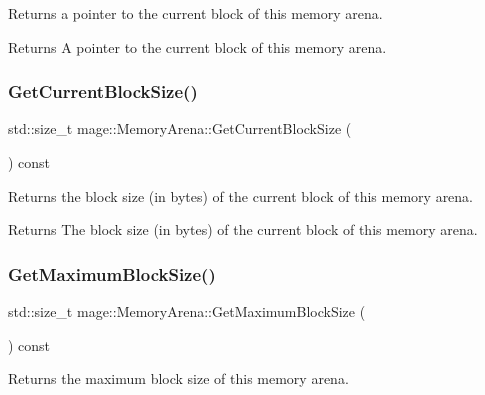Returns a pointer to the current block of this memory arena.

\begin{DoxyReturn}{Returns}
A pointer to the current block of this memory arena. 
\end{DoxyReturn}
\mbox{\label{classmage_1_1_memory_arena_a39be42ace3dfb2afab288926e2e0bca6}} 
\subsubsection{\texorpdfstring{Get\+Current\+Block\+Size()}{GetCurrentBlockSize()}}
{\footnotesize\ttfamily std\+::size\+\_\+t mage\+::\+Memory\+Arena\+::\+Get\+Current\+Block\+Size (\begin{DoxyParamCaption}{ }\end{DoxyParamCaption}) const\hspace{0.3cm}{\ttfamily [noexcept]}}

Returns the block size (in bytes) of the current block of this memory arena.

\begin{DoxyReturn}{Returns}
The block size (in bytes) of the current block of this memory arena. 
\end{DoxyReturn}
\mbox{\label{classmage_1_1_memory_arena_adecbc8148c10c1d50bc2639a44a59fa2}} 
\subsubsection{\texorpdfstring{Get\+Maximum\+Block\+Size()}{GetMaximumBlockSize()}}
{\footnotesize\ttfamily std\+::size\+\_\+t mage\+::\+Memory\+Arena\+::\+Get\+Maximum\+Block\+Size (\begin{DoxyParamCaption}{ }\end{DoxyParamCaption}) const\hspace{0.3cm}{\ttfamily [noexcept]}}

Returns the maximum block size of this memory arena.


